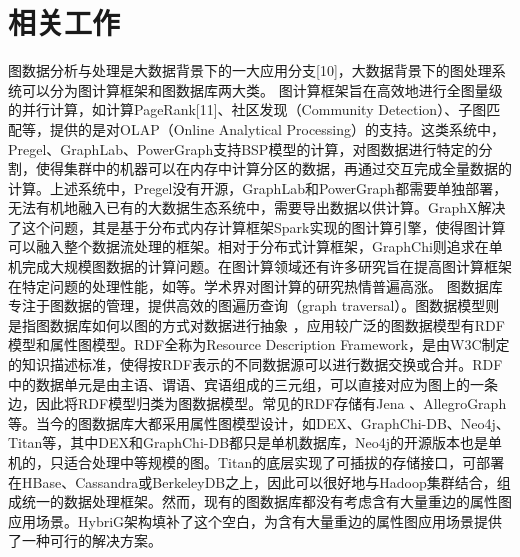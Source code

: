
\chapter{相关工作}
图数据分析与处理是大数据背景下的一大应用分支[10]，大数据背景下的图处理系统可以分为图计算框架和图数据库两大类。
图计算框架旨在高效地进行全图量级的并行计算，如计算PageRank[11]、社区发现\supercite{community_detection}（Community Detection）、子图匹配\supercite{subgraph_listing}等，提供的是对OLAP（Online Analytical Processing）的支持。这类系统中，Pregel\supercite{pregel}、GraphLab\supercite{graphlab}、PowerGraph\supercite{powergraph}支持BSP\supercite{BSP}模型的计算，对图数据进行特定的分割，使得集群中的机器可以在内存中计算分区的数据，再通过交互完成全量数据的计算。上述系统中，Pregel没有开源，GraphLab和PowerGraph都需要单独部署，无法有机地融入已有的大数据生态系统中，需要导出数据以供计算。GraphX\supercite{graphx}解决了这个问题，其是基于分布式内存计算框架Spark\supercite{spark}实现的图计算引擎，使得图计算可以融入整个数据流处理的框架。相对于分布式计算框架，GraphChi\supercite{graphchi}则追求在单机完成大规模图数据的计算问题。在图计算领域还有许多研究旨在提高图计算框架在特定问题的处理性能，如\supercites{xuning_LogGP,xuning_2,shaoxia_1,shaoxia_2,shaoxia_3}等。学术界对图计算的研究热情普遍高涨。
图数据库专注于图数据的管理，提供高效的图遍历查询（graph traversal）。图数据模型则是指图数据库如何以图的方式对数据进行抽象 \supercite{graph_models_survey}，应用较广泛的图数据模型有RDF 模型和属性图模型。RDF全称为Resource Description Framework，是由W3C制定的知识描述标准，使得按RDF表示的不同数据源可以进行数据交换或合并。RDF中的数据单元是由主语、谓语、宾语组成的三元组，可以直接对应为图上的一条边，因此将RDF模型归类为图数据模型。常见的RDF存储有Jena 、AllegroGraph 等。当今的图数据库大都采用属性图模型设计\supercite{graph_database_models}，如DEX\supercite{DEX}、GraphChi-DB\supercite{graphchi-db}、Neo4j、Titan等，其中DEX和GraphChi-DB都只是单机数据库，Neo4j的开源版本也是单机的，只适合处理中等规模的图。Titan的底层实现了可插拔的存储接口，可部署在HBase、Cassandra或BerkeleyDB之上，因此可以很好地与Hadoop集群结合，组成统一的数据处理框架。然而，现有的图数据库都没有考虑含有大量重边的属性图应用场景。HybriG架构填补了这个空白，为含有大量重边的属性图应用场景提供了一种可行的解决方案。


